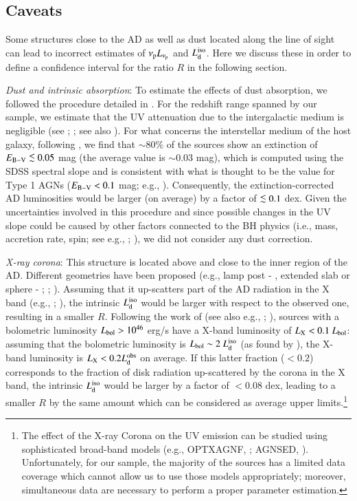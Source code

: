 \documentclass[]{aa}
\def\spose#1{\hbox to 0pt{#1\hss}}
\newcommand\lsim{\mathrel{\spose{\lower 3pt\hbox{$\mathchar"218$}}
     \raise 2.0pt\hbox{$\mathchar"13C$}}}
\begin{document}
\subsection{Caveats} \label{cavo}

Some structures close to the AD as well as dust located along the line of sight can lead to incorrect estimates of $\nu_{\rm p}L_{\nu_{\rm p}}$ and $L^{\rm iso}_{\rm d}$. Here we discuss these in order to define a confidence interval for the ratio $R$ in the following section. 

\textit{Dust and intrinsic absorption}: To estimate the effects of dust absorption, we followed the procedure detailed in \citet{Campitic}. For the redshift range spanned by our sample, we estimate that the UV attenuation due to the intergalactic medium is negligible (see \citealt{Madau}; \citealt{Haamad}; see also \citealt{Castietal}). For what concerns the interstellar medium of the host galaxy, following \citet{Baron}, we find that $\sim 80 \%$ of the sources show an extinction of $E_{\rm B-V} \lsim 0.05$ mag (the average value is $\sim 0.03$ mag), which is computed using the SDSS spectral slope and is consistent with what is thought to be the value for Type 1 AGNs ($E_{\rm B-V} < 0.1$ mag; e.g., \citealt{Kora}). Consequently, the extinction-corrected AD luminosities would be larger (on average) by a factor of $\lsim 0.1$ dex. Given the uncertainties involved in this procedure and since possible changes in the UV slope could be caused by other factors connected to the BH physics (i.e., mass, accretion rate, spin; see e.g., \citealt{Hub2000}; \citealt{DavLao}), we did not consider any dust correction.

\textit{X-ray corona}: This structure is located above and close to the inner region of the AD. Different geometries have been proposed (e.g., lamp post - \citealt{Miniu}, extended slab or sphere - \citealt{Petru}; \citealt{Chaina}; \citealt{Done}). Assuming that it up-scatters part of the AD radiation in the X band (e.g., \citealt{Sazo}; \citealt{LuRi}), the intrinsic $L^{\rm iso}_{\rm d}$ would be larger with respect to the observed one, resulting in a smaller $R$. Following the work of \citet{Duras} (see also e.g., \citealt{VasuFa}; \citealt{Lusso}), sources with a bolometric luminosity $L_{\rm bol} > 10^{46}$ erg/s have a X-band luminosity of $L_{\rm X} < 0.1\ L_{\rm bol}$: assuming that the bolometric luminosity is $L_{\rm bol} \sim 2\ L^{\rm iso}_{\rm d}$ (as found by \citealt{Caldero}), the X-band luminosity is $L_{\rm X} < 0.2 L^{\rm obs}_{\rm d}$ on average. If this latter fraction ($<0.2$) corresponds to the fraction of disk radiation up-scattered by the corona in the X band, the intrinsic $L^{\rm iso}_{\rm d}$ would be larger by a factor of $< 0.08$ dex, leading to a smaller $R$ by the same amount which can be considered as average upper limits.\footnote{The effect of the X-ray Corona on the UV emission can be studied using sophisticated broad-band models (e.g., OPTXAGNF, \citealt{Done}; AGNSED, \citealt{KuDo}). Unfortunately, for our sample, the majority of the sources has a limited data coverage which cannot allow us to use those models appropriately; moreover, simultaneous data are necessary to perform a proper parameter estimation.}
\end{document}
